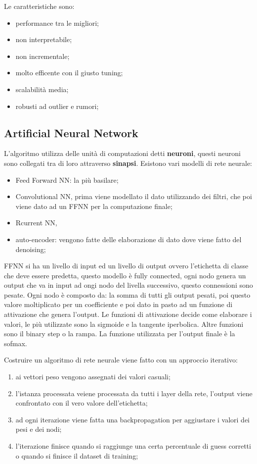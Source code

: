 \documentclass[12pt]{article}
\begin{document}
Le caratteristiche sono:
\begin{itemize}
    \item performance tra le migliori;
    \item non interpretabile;
    \item non incrementale;
    \item molto efficente con il giusto tuning;
    \item scalabilit\`a media;
    \item robusti ad outlier e rumori;
\end{itemize}


\subsection{Artificial Neural Network}
L'algoritmo utilizza delle unit\`a di computazioni detti \textbf{neuroni}, questi neuroni sono collegati tra di loro attraverso \textbf{sinapsi}. Esistono vari modelli di rete neurale:
\begin{itemize}
    \item Feed Forward NN: la pi\`u basilare;
    \item Convolutional NN, prima viene modellato il dato utilizzando dei filtri, che poi viene dato ad un FFNN per la computazione finale;
    \item Rcurrent NN, 
    \item auto-encoder: vengono fatte delle elaborazione di dato dove viene fatto del denoising;
\end{itemize}

FFNN si ha un livello di input ed un livello di output ovvero l'etichetta di classe che deve essere predetta, questo modello \`e fully connected, ogni nodo genera un output che va in input ad ongi nodo del livella successivo, questo connessioni sono pesate. Ogni nodo \`e composto da: la somma di tutti gli output pesati, poi questo valore moltiplicato per un coefficiente e poi dato in pasto ad un funzione di attivazione che genera l'output. Le funzioni di attivazione decide come elaborare i valori, le pi\`u utilizzate sono la sigmoide e la tangente iperbolica. Altre funzioni sono il binary step o la rampa. La funzione utilizzata per l'output finale \`e la sofmax. 

Costruire un algoritmo di rete neurale viene fatto con un approccio iterativo:
\begin{enumerate}
    \item ai vettori peso vengono assegnati dei valori casuali;
    \item l'istanza processata veiene processata da tutti i layer della rete, l'output viene confrontato con il vero valore dell'etichetta;
    \item ad ogni iterazione viene fatta una backpropagation per aggiustare i valori dei pesi e dei nodi;
    \item l'iterazione finisce quando si raggiunge una certa percentuale di guess corretti o quando si finisce il dataset di training;
\end{enumerate}
\end{document}

